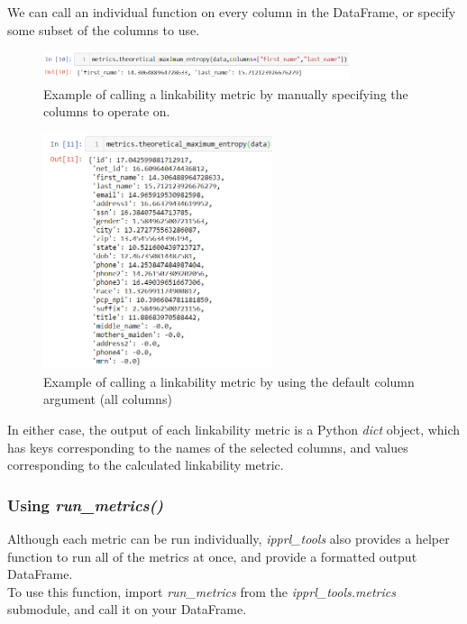 \documentclass[titlepage, 11pt]{article}
\newcommand{\pkgname}{\textit{ipprl\_tools}}
\begin{document}
We can call an individual function on every column in the DataFrame, or specify some subset of the columns to use. 

\begin{figure}[H]
    \centering
    \includegraphics[width=0.8\textwidth]{imgs/ColumnSubset.PNG}
    \caption{Example of calling a linkability metric by manually specifying the columns to operate on.}
    \label{fig:column_subset}
\end{figure}

\begin{figure}[H]
    \centering
    \includegraphics[width=0.6\textwidth]{imgs/AllColumns.PNG}
    \caption{Example of calling a linkability metric by using the default column argument (all columns)}
    \label{fig:all_columns}
\end{figure}

\noindent In either case, the output of each linkability metric is a Python \textit{dict} object, which has keys corresponding to the names of the selected columns, and values corresponding to the calculated linkability metric.

\subsubsection{Using \textit{run\_metrics()}}
Although each metric can be run individually, \pkgname{} also provides a helper function to run all of the metrics at once, and provide a formatted output DataFrame.
\\
\noindent To use this function, import \textit{run\_metrics} from the \textit{ipprl\_tools.metrics} submodule, and call it on your DataFrame.
\end{document}
